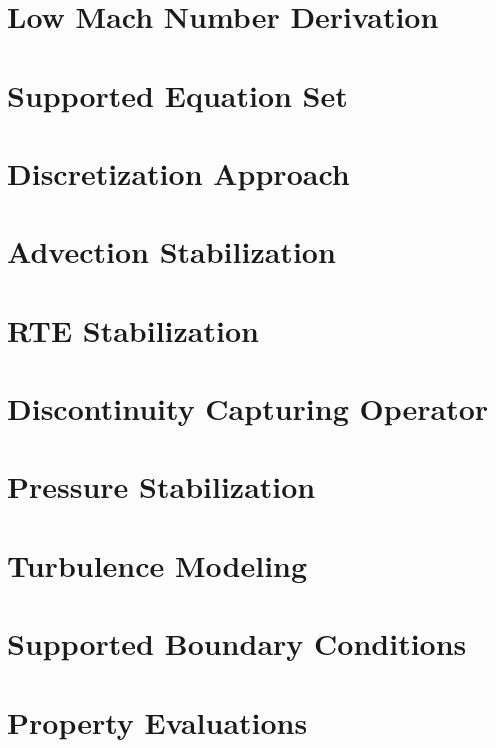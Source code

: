 \documentclass[12pt]{report}
\begin{document}
\section{Low Mach Number Derivation}


\section{Supported Equation Set}


\section{Discretization Approach}


\section{Advection Stabilization}


\section{RTE Stabilization}


\section{Discontinuity Capturing Operator}


\section{Pressure Stabilization}


\section{Turbulence Modeling}


\section{Supported Boundary Conditions}


\section{Property Evaluations}

\end{document}
